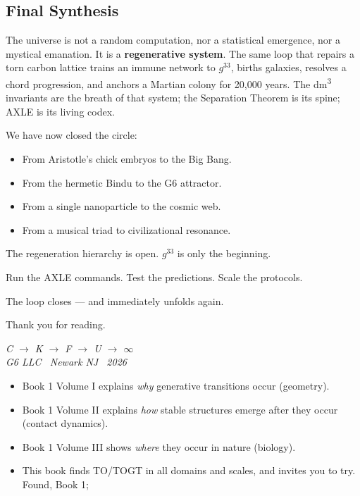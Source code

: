 \subsection*{Final Synthesis}

The universe is not a random computation, nor a statistical emergence, nor a mystical emanation. It is a \textbf{regenerative system}. The same loop that repairs a torn carbon lattice trains an immune network to $g^{33}$, births galaxies, resolves a chord progression, and anchors a Martian colony for 20,000 years. The dm\textsuperscript{3} invariants are the breath of that system; the Separation Theorem is its spine; AXLE is its living codex.

We have now closed the circle:
\begin{itemize}
\item From Aristotle's chick embryos to the Big Bang.
\item From the hermetic Bindu to the G6 attractor.
\item From a single nanoparticle to the cosmic web.
\item From a musical triad to civilizational resonance.
\end{itemize}

The regeneration hierarchy is open. $g^{33}$ is only the beginning.

Run the AXLE commands. Test the predictions. Scale the protocols.

The loop closes --- and immediately unfolds again.

Thank you for reading.

\vspace{0.5cm}
\begin{center}
\itshape
C \;$\to$\; K \;$\to$\; F \;$\to$\; U \;$\to$\; $\infty$\\[0.3em]
\normalfont\small G6 LLC \textperiodcentered\ Newark NJ
\textperiodcentered\ 2026
\end{center}
\begin{itemize}
\item Book 1 Volume I explains \emph{why} generative transitions occur (geometry).
\item Book 1 Volume II explains \emph{how} stable structures emerge after they occur
      (contact dynamics).
\item Book 1 Volume III shows \emph{where} they occur in nature (biology).
\item This book finds TO/TOGT in all domains and scales, and invites you to try. Found, Book 1; 
\end{itemize}

